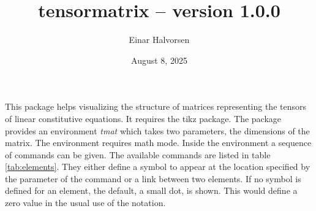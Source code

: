 \documentclass[12pt,a4paper]{article}
\begin{document}
\title{tensormatrix -- version 1.0.0}
\author{Einar Halvorsen}
\date{August 8, 2025}
\maketitle


This package helps visualizing the structure of matrices representing the tensors of linear constitutive equations. It requires the tikz package. The package provides an environment \textit{tmat} which takes two parameters, the dimensions of the matrix. The environment requires math mode. Inside the environment a sequence of commands can be given. The available commands are listed in table \ref{tab:elements}. They either define a symbol to appear at the location specified by the parameter of the command or a link between two elements. If no symbol is defined for an element, the default, a small dot, is shown. This would define a zero value in the usual use of the notation.   
\end{document}
